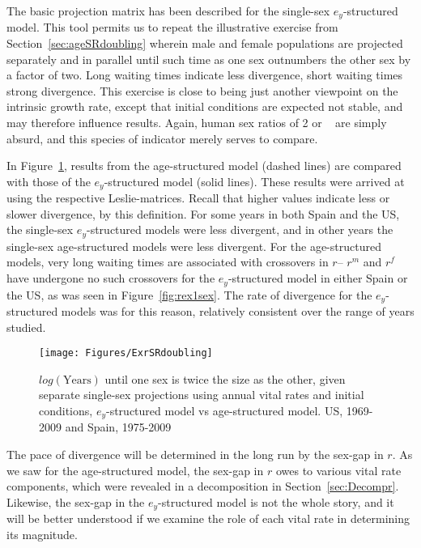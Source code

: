  \FloatBarrier
 \label{sex:doublingex}
The basic projection matrix has been described for the single-sex
$e_y$-structured model. This tool permits us to repeat the illustrative
exercise from Section~\ref{sec:ageSRdoubling} wherein male and female populations are
projected separately and in parallel until such time as one sex outnumbers the
other sex by a factor of two. Long waiting times indicate less divergence, short
waiting times strong divergence. This exercise is close to being just another
viewpoint on the intrinsic growth rate, except that initial conditions are
expected not stable, and may therefore influence results. Again,
human sex ratios of 2 or \textonehalf~ are simply absurd, and this species of
indicator merely serves to compare.

In Figure~\ref{fig:exSRdoubling}, results from the age-structured model (dashed
lines) are compared with those of the $e_y$-structured model (solid lines).
These results were arrived at using the respective Leslie-matrices. Recall that
higher values indicate less or slower divergence, by this definition. For some 
years in both Spain and the US, the single-sex $e_y$-structured models were less 
divergent, and in other years the single-sex age-structured models were less divergent.
 For the age-structured models, very long waiting times are associated
with crossovers in $r$-- $r^m$ and $r^f$ have undergone no such crossovers for
the $e_y$-structured model in either Spain or the US, as was seen in
Figure~\ref{fig:rex1sex}. The rate of divergence for the $e_y$-structured models
was for this reason, relatively consistent over the range of years studied. 

\begin{figure}[ht!]
        \centering  
          \caption{$log(\mathrm{Years})$ until one sex is twice the size as the
          other, given separate single-sex projections using annual vital rates and initial
          conditions, $e_y$-structured model vs age-structured model. US,
          1969-2009 and Spain, 1975-2009}
           \texttt{[image: Figures/ExrSRdoubling]}
          \label{fig:exSRdoubling}
\end{figure}

The pace of divergence will be determined in the long run by the sex-gap in $r$.
As we saw for the age-structured model, the sex-gap in $r$ owes to various vital
rate components, which were revealed in a decomposition in
Section~\ref{sec:Decompr}. Likewise, the sex-gap in the $e_y$-structured model
is not the whole story, and it will be better understood if we examine the role
of each vital rate in determining its magnitude.

 \FloatBarrier